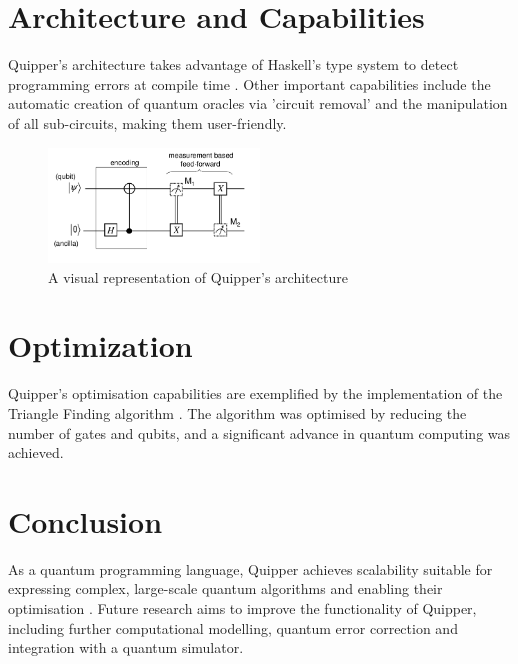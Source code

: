 \documentclass[11pt, twocolumn]{article}
\begin{document}
\section{Architecture and Capabilities}
Quipper's architecture takes advantage of Haskell's type system to detect programming errors at compile time \cite{DBLP:journals/corr/abs-1304-3390}. Other important capabilities include the automatic creation of quantum oracles via 'circuit removal' and the manipulation of all sub-circuits, making them user-friendly.

\begin{figure}[h]
\centering
\includegraphics[width=0.5\textwidth]{img.png}
\caption{A visual representation of Quipper's architecture}
\end{figure}

\section{Optimization}
Quipper's optimisation capabilities are exemplified by the implementation of the Triangle Finding algorithm \cite{DBLP:journals/corr/abs-1304-3390}. The algorithm was optimised by reducing the number of gates and qubits, and a significant advance in quantum computing was achieved.

\section{Conclusion}
As a quantum programming language, Quipper achieves scalability suitable for expressing complex, large-scale quantum algorithms and enabling their optimisation \cite{DBLP:journals/corr/abs-1304-3390}. Future research aims to improve the functionality of Quipper, including further computational modelling, quantum error correction and integration with a quantum simulator.

\newpage



\end{document}
